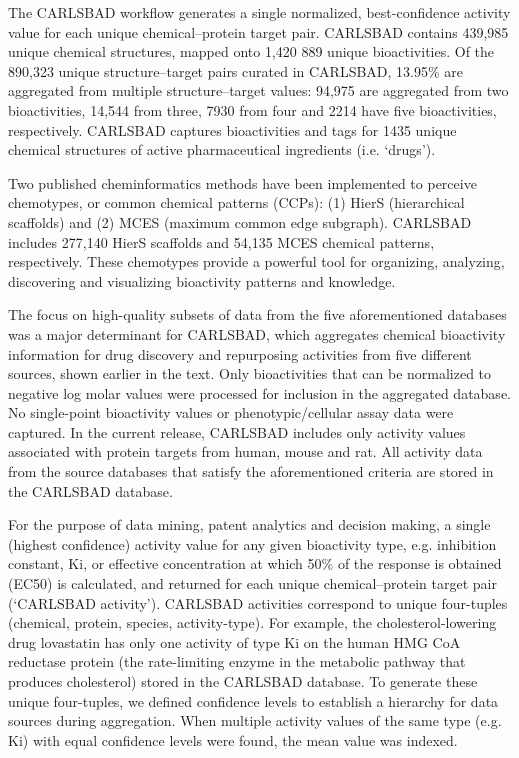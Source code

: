 The CARLSBAD workflow generates a single normalized, best-confidence activity value for each unique chemical–protein target pair. CARLSBAD contains 439,985 unique chemical structures, mapped onto 1,420 889 unique bioactivities. Of the 890,323 unique structure–target pairs curated in CARLSBAD, 13.95\% are aggregated from multiple structure–target values: 94,975 are aggregated from two bioactivities, 14,544 from three, 7930 from four and 2214 have five bioactivities, respectively.  CARLSBAD captures bioactivities and tags for 1435 unique chemical structures of active pharmaceutical ingredients (i.e. ‘drugs’). 

Two published cheminformatics methods have been implemented to perceive chemotypes, or common chemical patterns (CCPs): (1) HierS (hierarchical scaffolds) and (2) MCES (maximum common edge subgraph). CARLSBAD includes 277,140 HierS scaffolds and 54,135 MCES chemical patterns, respectively. These chemotypes provide a powerful tool for organizing, analyzing, discovering and visualizing bioactivity patterns and knowledge.

The focus on high-quality subsets of data from the five aforementioned databases was a major determinant for CARLSBAD, which aggregates chemical bioactivity information for drug discovery and repurposing activities from five different sources, shown earlier in the text. Only bioactivities that can be normalized to negative log molar values were processed for inclusion in the aggregated database. No single-point bioactivity values or phenotypic/cellular assay data were captured. In the current release, CARLSBAD includes only activity values associated with protein targets from human, mouse and rat. All activity data from the source databases that satisfy the aforementioned criteria are stored in the CARLSBAD database.

For the purpose of data mining, patent analytics and decision making, a single (highest confidence) activity value for any given bioactivity type, e.g. inhibition constant, Ki, or effective concentration at which 50\% of the response is obtained (EC50) is calculated, and returned for each unique chemical–protein target pair (‘CARLSBAD activity’). CARLSBAD activities correspond to unique four-tuples (chemical, protein, species, activity-type). For example, the cholesterol-lowering drug lovastatin has only one activity of type Ki on the human HMG CoA reductase protein (the rate-limiting enzyme in the metabolic pathway that produces cholesterol) stored in the CARLSBAD database. To generate these unique four-tuples, we defined confidence levels to establish a hierarchy for data sources during aggregation. When multiple activity values of the same type (e.g. Ki) with equal confidence levels were found, the mean value was indexed.


